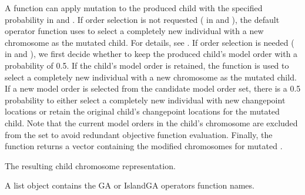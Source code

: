 \documentclass[a4paper]{book}
\begin{document}
%
\begin{Details}
A function can apply mutation to the produced child with the specified
probability  in  and
. If order selection is not requested
( in  and ), the default
 operator function uses  to select
a completely new individual with a new chromosome as the mutated child.
For details, see . If order selection is needed
( in  and ), we first
decide whether to keep the produced child's model order with a probability
of 0.5. If the child's model order is retained, the 
function is used to select a completely new individual with a new chromosome
as the mutated child. If a new model order is selected from the candidate
model order set, there is a 0.5 probability to either select a completely new
individual with new changepoint locations or retain the original child's
changepoint locations for the mutated child. Note that the current model
orders in the child's chromosome are excluded from the set to avoid redundant
objective function evaluation. Finally, the function returns a vector
containing the modified chromosomes for mutated .
\end{Details}
%
\begin{Value}
The resulting child chromosome representation.
\end{Value}
%
\begin{Description}
A list object contains the GA or IslandGA operators function names.
\end{Description}
%
\end{document}
